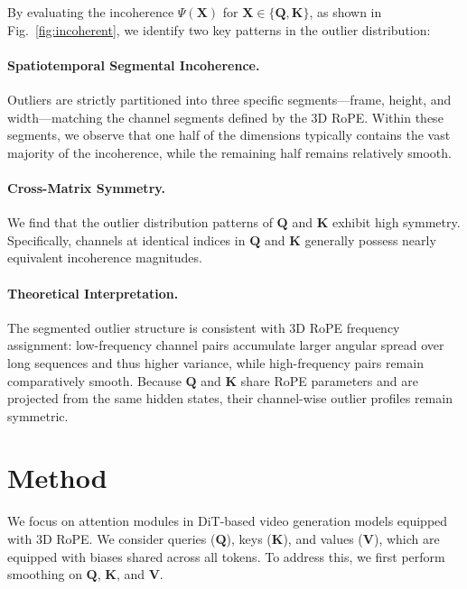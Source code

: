 By evaluating the incoherence $\Psi(\mathbf{X})$ for $\mathbf{X} \in \{\mathbf{Q}, \mathbf{K}\}$, as shown in Fig.~\ref{fig:incoherent}, we identify two key patterns in the outlier distribution:

\paragraph{\textbf{Spatiotemporal Segmental Incoherence.}} 
Outliers are strictly partitioned into three specific segments---frame, height, and width---matching the channel segments defined by the 3D RoPE. Within these segments, we observe that one half of the dimensions typically contains the vast majority of the incoherence, while the remaining half remains relatively smooth.

\paragraph{\textbf{Cross-Matrix Symmetry.}} 
We find that the outlier distribution patterns of $\mathbf{Q}$ and $\mathbf{K}$ exhibit high symmetry. Specifically, channels at identical indices in $\mathbf{Q}$ and $\mathbf{K}$ generally possess nearly equivalent incoherence magnitudes.

\paragraph{\textbf{Theoretical Interpretation.}}
The segmented outlier structure is consistent with 3D RoPE frequency assignment: low-frequency channel pairs accumulate larger angular spread over long sequences and thus higher variance, while high-frequency pairs remain comparatively smooth. Because $\mathbf{Q}$ and $\mathbf{K}$ share RoPE parameters and are projected from the same hidden states, their channel-wise outlier profiles remain symmetric.







\section{Method}
We focus on attention modules in DiT-based video generation models equipped with 3D RoPE. 
We consider queries ($\mathbf{Q}$), keys ($\mathbf{K}$), and values ($\mathbf{V}$), which are equipped with biases shared across all tokens. To address this, we first perform smoothing on $\mathbf{Q}$, $\mathbf{K}$, and $\mathbf{V}$. 

